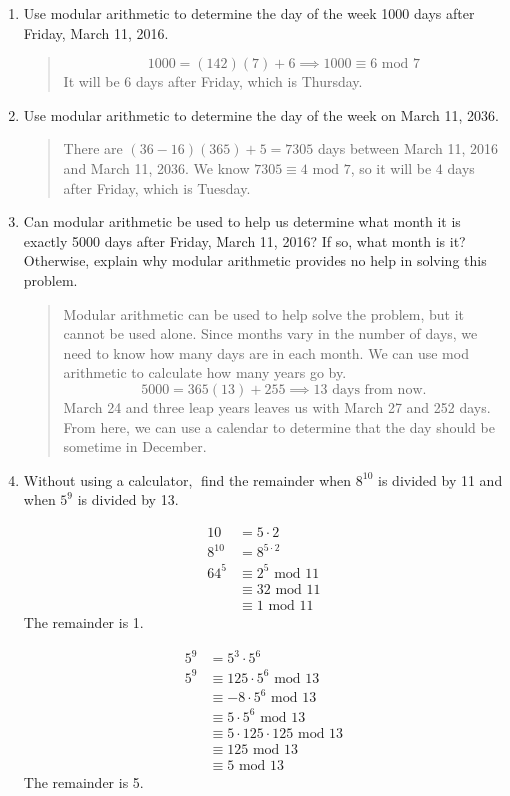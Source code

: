 \documentclass{hw}
\begin{document}
\begin{enumerate}
\item Use modular arithmetic to determine the day of the week 1000 days after Friday, March 11, 2016.
\begin{quote}
\[
1000 = (142)(7) + 6 \implies 1000\equiv6\text{ mod }7
\]
It will be 6 days after Friday, which is Thursday.
\end{quote}

\item Use modular arithmetic to determine the day of the week on March 11, 2036.
\begin{quote}
There are $(36-16)(365)+5=7305$ days between March 11, 2016 and March 11, 2036. We know
$7305\equiv4\text{ mod }7$, so it will be $4$ days after Friday, which is Tuesday.
\end{quote}

\item Can modular arithmetic be used to help us determine what month it is exactly 5000 days after Friday,
March 11, 2016?  If so, what month is it?  Otherwise, explain why modular arithmetic provides no help
in solving this problem.
\begin{quote}
Modular arithmetic can be used to help solve the problem, but it cannot be used alone. Since months vary
in the number of days, we need to know how many days are in each month. We can use mod arithmetic to
calculate how many years go by.
\[
5000 = 365(13)+255\implies 13\text{ days from now}.
\]
March 24 and three leap years leaves us with March 27 and 252 days. From here, we can use a calendar
to determine that the day should be sometime in December.
\end{quote}

\item Without using a calculator, find the remainder when $8^{10}$ is divided by 11 and when $5^9$
is divided by 13.

\begin{minipage}[b]{0.5\textwidth}
\begin{align*}
10 &= 5 \cdot 2\\
8^{10} &= 8^{5\cdot2}\\
64^5&\equiv2^5\text{ mod }11\\
&\equiv32\text{ mod }11\\
&\equiv1\text{ mod }11
\end{align*}
The remainder is 1.
\end{minipage}
\begin{minipage}[b]{0.5\textwidth}
\begin{align*}
5^9 &= 5^3\cdot5^6\\
5^9 &\equiv 125\cdot5^6\text{ mod }13\\
&\equiv -8\cdot5^6\text{ mod }13\\
&\equiv 5\cdot5^6\text{ mod }13\\
&\equiv 5\cdot125\cdot125\text{ mod }13\\
&\equiv 125\text{ mod }13\\
&\equiv 5\text{ mod }13
\end{align*}
The remainder is 5.
\end{minipage}


\end{enumerate}
\end{document}
